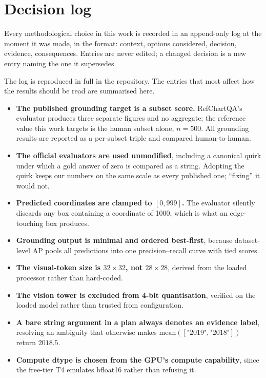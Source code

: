 \section{Decision log}
\label{app:decisions}

Every methodological choice in this work is recorded in an append-only log at the moment it was
made, in the format: context, options considered, decision, evidence, consequences. Entries are
never edited; a changed decision is a new entry naming the one it supersedes.

The log is reproduced in full in the repository. The entries that most affect how the results should
be read are summarised here.

\begin{itemize}
  \item \textbf{The published grounding target is a subset score.} RefChartQA's evaluator produces
        three separate figures and no aggregate; the reference value this work targets is the human
        subset alone, $n=500$. All grounding results are reported as a per-subset triple and
        compared human-to-human.
  \item \textbf{The official evaluators are used unmodified}, including a canonical quirk under which
        a gold answer of zero is compared as a string. Adopting the quirk keeps our numbers on the
        same scale as every published one; ``fixing'' it would not.
  \item \textbf{Predicted coordinates are clamped to $[0,999]$.} The evaluator silently discards any
        box containing a coordinate of 1000, which is what an edge-touching box produces.
  \item \textbf{Grounding output is minimal and ordered best-first}, because dataset-level AP pools
        all predictions into one precision--recall curve with tied scores.
  \item \textbf{The visual-token size is $32\times32$, not $28\times28$}, derived from the loaded
        processor rather than hard-coded.
  \item \textbf{The vision tower is excluded from 4-bit quantisation}, verified on the loaded model
        rather than trusted from configuration.
  \item \textbf{A bare string argument in a plan always denotes an evidence label}, resolving an
        ambiguity that otherwise makes $\mathrm{mean}([\text{"2019"},\text{"2018"}])$ return
        $2018.5$.
  \item \textbf{Compute dtype is chosen from the GPU's compute capability}, since the free-tier T4
        emulates bfloat16 rather than refusing it.
\end{itemize}

